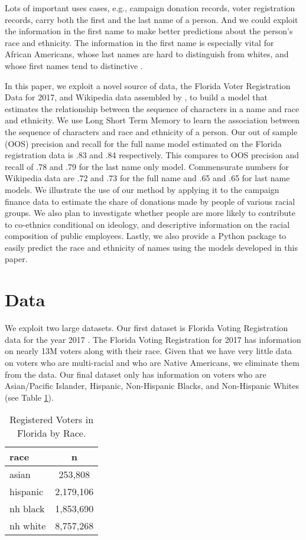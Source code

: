 \documentclass[12pt, letterpaper]{article}
\begin{document}
Lots of important uses cases, e.g., campaign donation records, voter registration records, carry both the first and the last name of a person. And we could exploit the information in the first name to make better predictions about the person's race and ethnicity. The information in the first name is especially vital for African Americans, whose last names are hard to distinguish from whites, and whose first names tend to distinctive \citep{bertrand2004emily}. 

In this paper, we exploit a novel source of data, the Florida Voter Registration Data for 2017, and Wikipedia data assembled by \citet{ambekar2009name}, to build a model that estimates the relationship between the sequence of characters in a name and race and ethnicity. We use Long Short Term Memory to learn the association between the sequence of characters and race and ethnicity of a person. Our out of sample (OOS) precision and recall for the full name model estimated on the Florida registration data is .83 and .84 respectively. This compares to OOS precision and recall of .78 and .79 for the last name only model. Commensurate numbers for Wikipedia data are .72 and .73 for the full name and .65 and .65 for last name models. We illustrate the use of our method by applying it to the campaign finance data to estimate the share of donations made by people of various racial groups. We also plan to investigate whether people are more likely to contribute to co-ethnics conditional on ideology, and descriptive information on the racial composition of public employees. Lastly, we also provide a Python package to easily predict the race and ethnicity of names using the models developed in this paper.

\section*{Data}
We exploit two large datasets. Our first dataset is Florida Voting Registration data for the year 2017 \citep{sood_2017}. The Florida Voting Registration for 2017 has information on nearly 13M voters along with their race. Given that we have very little data on voters who are multi-racial and who are Native Americans, we eliminate them from the data. Our final dataset only has information on voters who are Asian/Pacific Islander, Hispanic, Non-Hispanic Blacks, and Non-Hispanic Whites (see Table \ref{table:fl_data}). 

\begin{table}[h!]
\centering
\caption{Registered Voters in Florida by Race.}
\begin{tabular}{ l c }
\hline    
race & n \\
\hline
asian & 253,808 \\
hispanic & 2,179,106 \\
nh black & 1,853,690 \\
nh white & 8,757,268 \\
\hline
\end{tabular}
\label{table:fl_data}
\end{table}
\end{document}
